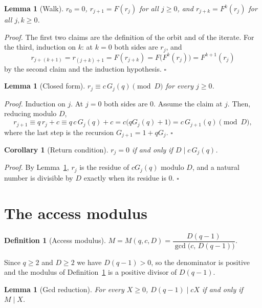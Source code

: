 \documentclass[11pt,letterpaper]{article}
\newtheorem{lemma}[theorem]{Lemma}
\newtheorem{corollary}[theorem]{Corollary}
\newtheorem{definition}[theorem]{Definition}
\newenvironment{proof}{\noindent\textit{Proof.}}{\hfill\(\square\)}
\begin{document}
\begin{lemma}[Walk]\label{Lem:Walk}
\(r_0=0\), \(r_{j+1}=F(r_j)\) for all \(j\ge0\), and \(r_{j+k}=F^k(r_j)\) for
all \(j,k\ge0\).
\end{lemma}

\begin{proof}
The first two claims are the definition of the orbit and of the iterate. For
the third, induction on \(k\): at \(k=0\) both sides are \(r_j\), and
\[
r_{j+(k+1)}=r_{(j+k)+1}=F(r_{j+k})=F\bigl(F^k(r_j)\bigr)=F^{k+1}(r_j)
\]
by the second claim and the induction hypothesis.
\end{proof}

\begin{lemma}[Closed form]\label{Lem:Offset}
\(r_j\equiv c\,G_j(q)\pmod D\) for every \(j\ge0\).
\end{lemma}

\begin{proof}
Induction on \(j\). At \(j=0\) both sides are \(0\). Assume the claim at
\(j\). Then, reducing modulo \(D\),
\[
r_{j+1}\equiv q\,r_j+c\equiv q\,c\,G_j(q)+c=c\bigl(qG_j(q)+1\bigr)
=c\,G_{j+1}(q)\pmod D,
\]
where the last step is the recursion \(G_{j+1}=1+qG_j\).
\end{proof}

\begin{corollary}[Return condition]\label{Cor:ReturnCondition}
\(r_j=0\) if and only if \(D\mid c\,G_j(q)\).
\end{corollary}

\begin{proof}
By Lemma~\ref{Lem:Offset}, \(r_j\) is the residue of \(cG_j(q)\) modulo \(D\),
and a natural number is divisible by \(D\) exactly when its residue is \(0\).
\end{proof}

\section{The access modulus}

\begin{definition}[Access modulus]\label{Def:Modulus}
\(M=M(q,c,D)=\dfrac{D(q-1)}{\gcd\bigl(c,\,D(q-1)\bigr)}\).
\end{definition}

Since \(q\ge2\) and \(D\ge2\) we have \(D(q-1)>0\), so the denominator is
positive and the modulus of Definition~\ref{Def:Modulus} is a positive
divisor of \(D(q-1)\).

\begin{lemma}[Gcd reduction]\label{Lem:GcdReduction}
For every \(X\ge0\), \(D(q-1)\mid cX\) if and only if \(M\mid X\).
\end{lemma}
\end{document}
